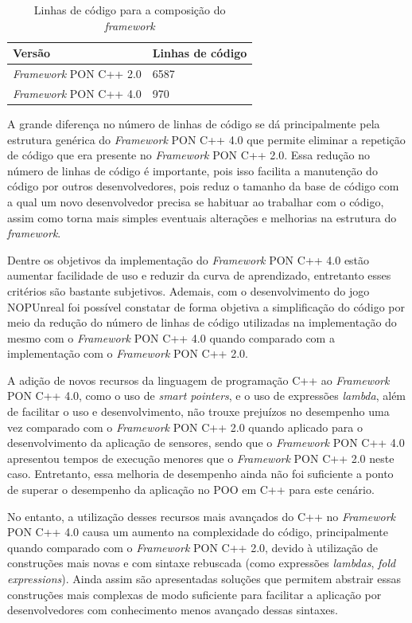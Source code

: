\begin{table}[!htb]
\centering
\caption{Linhas de código para a composição do \textit{framework}}
\smallskip
\begin{tabularx}{0.8\textwidth}{|X|X|}
\hline
Versão & Linhas de código\\
\hline
\textit{Framework} PON C++ 2.0 & 6587 \\
\hline
\textit{Framework} PON C++ 4.0 & 970 \\
\hline
\end{tabularx}
\label{tab:linhas_de_codigo}
\end{table}

A grande diferença no número de linhas de código se dá principalmente pela
estrutura genérica do \textit{Framework} PON C++ 4.0 que permite eliminar a
repetição de código que era presente no \textit{Framework} PON C++ 2.0. Essa
redução no número de linhas de código é importante, pois isso facilita a
manutenção do código por outros desenvolvedores, pois reduz o tamanho da base de
código com a qual um novo desenvolvedor precisa se habituar ao trabalhar com o
código, assim como torna mais simples eventuais alterações e melhorias na
estrutura do \textit{framework}.

Dentre os objetivos da implementação do \textit{Framework} PON C++ 4.0 estão
aumentar facilidade de uso e reduzir da curva de aprendizado, entretanto esses
critérios são bastante subjetivos. Ademais, com o desenvolvimento do jogo
NOPUnreal foi possível constatar de forma objetiva a simplificação do código por
meio da redução do número de linhas de código utilizadas na implementação do
mesmo com o \textit{Framework} PON C++ 4.0 quando comparado com a implementação
com o \textit{Framework} PON C++ 2.0.

A adição de novos recursos da linguagem de programação C++ ao \textit{Framework}
PON C++ 4.0, como o uso de \textit{smart pointers}, e o uso de expressões
\textit{lambda}, além de facilitar o uso e desenvolvimento, não trouxe prejuízos
no desempenho uma vez comparado com o \textit{Framework} PON C++ 2.0 quando
aplicado para o desenvolvimento da aplicação de sensores, sendo que o
\textit{Framework} PON C++ 4.0 apresentou tempos de execução menores que o
\textit{Framework} PON C++ 2.0 neste caso. Entretanto, essa melhoria de
desempenho ainda não foi suficiente a ponto de superar o desempenho da aplicação
no POO em C++ para este cenário.

No entanto, a utilização desses recursos mais avançados do C++ no
\textit{Framework} PON C++ 4.0 causa um aumento na complexidade do código,
principalmente quando comparado com o \textit{Framework} PON C++ 2.0, devido à
utilização de construções mais novas e com sintaxe rebuscada (como expressões
\textit{lambdas}, \textit{fold expressions}). Ainda assim são apresentadas
soluções que permitem abstrair essas construções mais complexas de modo
suficiente para facilitar a aplicação por desenvolvedores com conhecimento menos
avançado dessas sintaxes.

